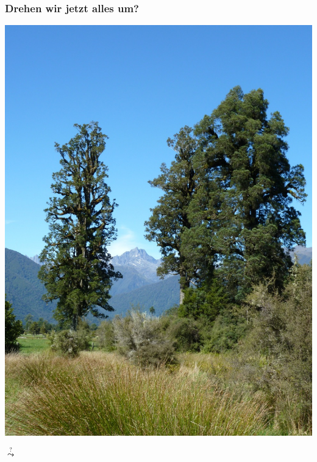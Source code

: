     \begin{frame}
      \frametitle{Drehen wir jetzt alles um? \smiley}

      \begin{center}
        \begin{minipage}{.45\textwidth}
          \includegraphics[width=\linewidth]{img+txt/matheson_baum.jpg}
        \end{minipage}
        \hfill
        {\Large $\stackrel{?}{\leadsto}$}
        \hfill
        \begin{minipage}{.45\textwidth}

\end{minipage}
\end{center}
\end{frame}
